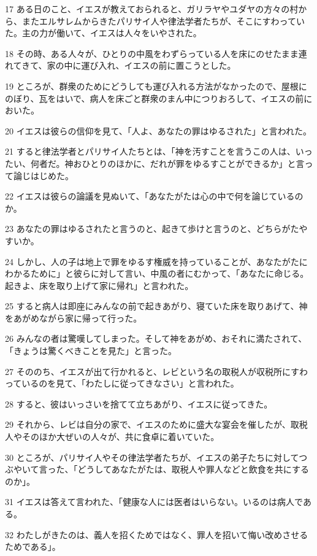 \par 17 ある日のこと、イエスが教えておられると、ガリラヤやユダヤの方々の村から、またエルサレムからきたパリサイ人や律法学者たちが、そこにすわっていた。主の力が働いて、イエスは人々をいやされた。
\par 18 その時、ある人々が、ひとりの中風をわずらっている人を床にのせたまま連れてきて、家の中に運び入れ、イエスの前に置こうとした。
\par 19 ところが、群衆のためにどうしても運び入れる方法がなかったので、屋根にのぼり、瓦をはいで、病人を床ごと群衆のまん中につりおろして、イエスの前においた。
\par 20 イエスは彼らの信仰を見て、「人よ、あなたの罪はゆるされた」と言われた。
\par 21 すると律法学者とパリサイ人たちとは、「神を汚すことを言うこの人は、いったい、何者だ。神おひとりのほかに、だれが罪をゆるすことができるか」と言って論じはじめた。
\par 22 イエスは彼らの論議を見ぬいて、「あなたがたは心の中で何を論じているのか。
\par 23 あなたの罪はゆるされたと言うのと、起きて歩けと言うのと、どちらがたやすいか。
\par 24 しかし、人の子は地上で罪をゆるす権威を持っていることが、あなたがたにわかるために」と彼らに対して言い、中風の者にむかって、「あなたに命じる。起きよ、床を取り上げて家に帰れ」と言われた。
\par 25 すると病人は即座にみんなの前で起きあがり、寝ていた床を取りあげて、神をあがめながら家に帰って行った。
\par 26 みんなの者は驚嘆してしまった。そして神をあがめ、おそれに満たされて、「きょうは驚くべきことを見た」と言った。
\par 27 そののち、イエスが出て行かれると、レビという名の取税人が収税所にすわっているのを見て、「わたしに従ってきなさい」と言われた。
\par 28 すると、彼はいっさいを捨てて立ちあがり、イエスに従ってきた。
\par 29 それから、レビは自分の家で、イエスのために盛大な宴会を催したが、取税人やそのほか大ぜいの人々が、共に食卓に着いていた。
\par 30 ところが、パリサイ人やその律法学者たちが、イエスの弟子たちに対してつぶやいて言った、「どうしてあなたがたは、取税人や罪人などと飲食を共にするのか」。
\par 31 イエスは答えて言われた、「健康な人には医者はいらない。いるのは病人である。
\par 32 わたしがきたのは、義人を招くためではなく、罪人を招いて悔い改めさせるためである」。

